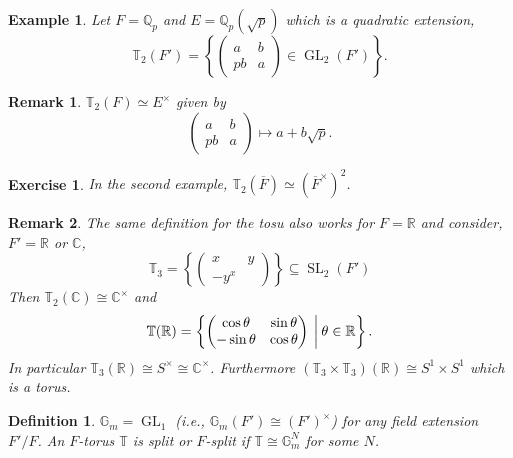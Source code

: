 \documentclass[10pt]{article}
\newtheorem{definition}{Definition}[section]
\newtheorem{remark}{Remark}[section]
\newtheorem{example}{Example}[section]
\newtheorem{exercise}{Exercise}[section]
\numberwithin{equation}{theorem}
\DeclareMathOperator{\GL}{GL}
\DeclareMathOperator{\SL}{SL}
\newcommand{\bR}[0]{\mathbb{R}}
\newcommand{\C}[0]{\mathbb{C}}
\newcommand{\bQ}[0]{\mathbb{Q}}
\newcommand{\G}[0]{\mathbb{G}}
\newcommand{\bT}[0]{\mathbb{T}}
\begin{document}
\begin{example}
    Let $F = \bQ_p$ and $E = \bQ_p(\sqrt{p})$ which is a quadratic extension, 
    \begin{equation*}
        \bT_2(F') = \left\{\begin{pmatrix}
        a & b \\ pb &a
        \end{pmatrix}\in\GL_2(F')\right\}.
    \end{equation*}
\end{example}

\begin{remark}
    $\bT_2(F)\simeq E^\times$ given by 
    \begin{equation*}
        \begin{pmatrix}
            a & b\\
            pb & a
        \end{pmatrix}
        \mapsto a+b\sqrt{p}.
    \end{equation*}
\end{remark}

\begin{exercise}
In the second example, $\bT_2(\overline{F})\simeq (\overline{F}^\times)^2$. 
\end{exercise}

\begin{remark}
    The same definition for the tosu also works for $F=\bR$ and consider, $F' = \bR$ or $\C$, 
    \begin{equation*}
        \bT_3 = \left\{\begin{pmatrix}
            x & y \\ -y ^x 
        \end{pmatrix}\right\}\subseteq\SL_2(F')
    \end{equation*}
    Then $\bT_2(\C) \cong \C^\times $ and 
    \begin{equation*}
        \bT(\bR)=\left\{\begin{pmatrix}
            \cos\theta&\sin\theta\\ -\sin\theta&\cos\theta
        \end{pmatrix}\:\bigg{\vert}\:\theta\in\bR\right\}.
    \end{equation*}
    In particular $\bT_3(\bR)\cong S^\times\cong \C^\times$. Furthermore $(\bT_3\times \bT_3)(\bR)\cong S^1\times S^1$ which is a torus.
\end{remark}

\begin{definition}
    $\G_m = \GL_1$ (i.e., $\G_m(F') \cong (F')^\times$) for any field extension $F'/F$. An $F$-torus $\bT$ is split or $F$-split if $\bT\cong \G_m^N$ for some $N$.
\end{definition}
\end{document}
